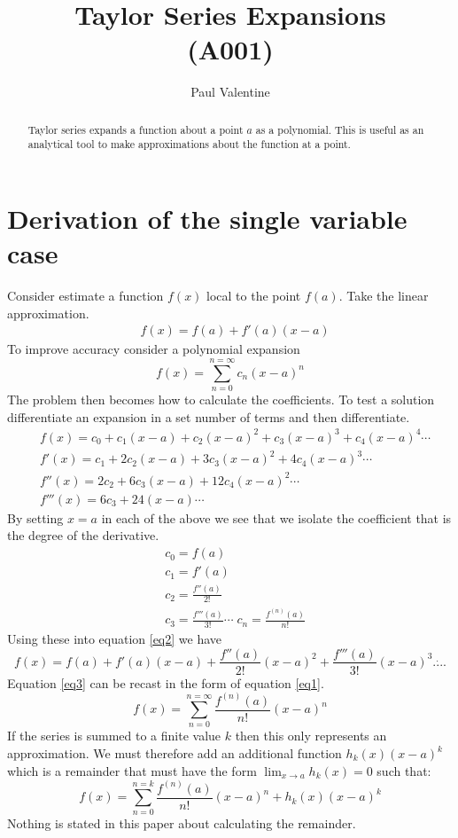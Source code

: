 \documentclass[a4paper]{article}
\title{\textbf{Taylor Series Expansions}\\(A001)}
\author{Paul Valentine}
\begin{document}
\maketitle
\begin{abstract}
Taylor series expands a function about a point $a$ as a polynomial. This is useful as an analytical tool to make approximations about the function at a point.
\end{abstract}
\section{Derivation of the single variable case}
Consider estimate a function $f(x)$ local to the point $f(a)$. Take the linear approximation.
\begin{align}
&f(x) = f(a)+f'(a)(x-a)
\end{align}
To improve accuracy consider a polynomial expansion
\begin{equation}
\label{eq1}
f(x)=\sum_{n=0}^{n=\infty}	c_n (x-a)^n
\end{equation}
The problem then becomes how to calculate the coefficients. To test a solution differentiate an expansion in a set number of terms and then differentiate.
\begin{align}
&f(x) = c_0 + c_1 (x-a) + c_2 (x-a)^2 + c_3 (x-a)^3 + c_4 (x-a)^4\cdots\label{eq2}\\
&f'(x) = c_1 + 2 c_2 (x-a) + 3c_3 (x-a)^2 +4c_4 (x-a)^3 \cdots\\
&f''(x) = 2 c_2 + 6c_3(x-a) + 12c_4(x-a)^2\cdots\\
&f'''(x)=6c_3 + 24(x-a) \cdots
\end{align}
By setting $x=a$ in each of the above we see that we isolate the coefficient that is the degree of the derivative.
\begin{align}
&c_0 = f(a)\\
&c_1 = f'(a)\\
&c_2 = \frac{f''(a)}{2!}\\
&c_3 = \frac{f'''(a)}{3!}\cdots\; c_n =\frac{f^{(n)}(a)}{n!}
\end{align}
Using these into equation \ref{eq2} we have
\begin{equation}
\label{eq3}
f(x) = f(a) + f'(a)(x-a) + \frac{f''(a)}{2!}(x-a)^2+\frac{f'''(a)}{3!}(x-a)^3 \dot{....}
\end{equation}
Equation \ref{eq3} can be recast in the form of equation \ref{eq1}.
\begin{equation}
f(x)=\sum_{n=0}^{n=\infty} \frac{f^{(n)}(a)}{n!} (x-a)^n
\end{equation}
If the series is summed to a finite value $k$ then this only represents an approximation. We must therefore add an additional function $h_k(x)(x-a)^k$ which is a remainder that must have the form $\displaystyle{\lim_{x\to a}}h_k(x)=0$ such that:
\begin{equation}
f(x)=\sum_{n=0}^{n=k} \frac{f^{(n)}(a)}{n!} (x-a)^n +h_k(x)(x-a)^k
\end{equation}
Nothing is stated in this paper about calculating the remainder.

\end{document}
